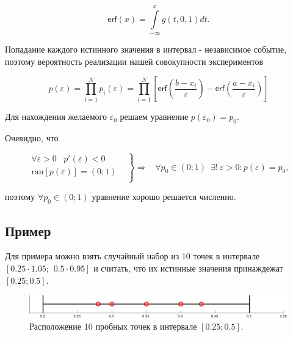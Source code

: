 \documentclass[a4paper,12pt]{article} %
\begin{document}
\begin{equation}
\textsf{erf}(x) = \int\limits_{- \infty}^x g(t, 0, 1) dt.
\end{equation}

Попадание каждого истинного значения в интервал - независимое событие, поэтому вероятность реализации нашей совокупности экспериментов

\begin{equation}
p(\varepsilon) = \prod_{i = 1}^N p_i(\varepsilon) = \prod_{i = 1}^N \left[ \textsf{erf} \left( \dfrac{b - x_i}{\varepsilon} \right) - \textsf{erf} \left( \dfrac{a - x_i}{\varepsilon} \right) \right]
\end{equation}

Для нахождения желаемого $\varepsilon_0$ решаем уравнение $p(\varepsilon_0) = p_0$. 

Очевидно, что

\begin{equation} 
\left.
\begin{aligned} 
\forall \varepsilon > 0 \hspace{10pt} p'(\varepsilon) < 0 & \\
\text{ran} [p(\varepsilon)] = (0;1) & \\
\end{aligned}
\right\} \Rightarrow \hspace{10pt} \forall p_0 \in (0;1) \hspace{6pt} \exists ! \hspace{3pt} \varepsilon > 0 : p(\varepsilon) = p_0,
\end{equation}

поэтому $\forall p_0 \in (0;1)$ уравнение хорошо решается численно.

\subsection{Пример}

Для примера можно взять случайный набор из 10 точек в интервале $[0.25 \cdot 1.05; \hspace{5pt} 0.5 \cdot 0.95]$ и считать, что их истинные значения принаждежат $[0.25; 0.5]$.

\newpage

\begin{figure}[h!]
\begin{center}
\includegraphics[width=1\textwidth]{./pics/rand_line}
\end{center}
\caption{Расположение 10 пробных точек в интервале $[0.25; 0.5]$.} \label{img:rand_line}
\end{figure}
\end{document}
